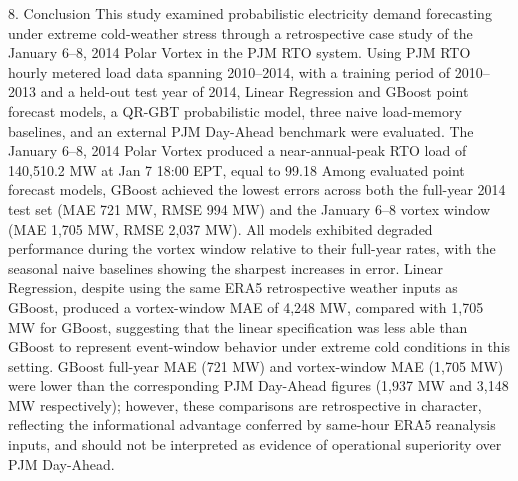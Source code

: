 8. Conclusion
This study examined probabilistic electricity demand forecasting under extreme cold-weather stress through a retrospective case study of the January 6–8, 2014 Polar Vortex in the PJM RTO system. Using PJM RTO hourly metered load data spanning 2010–2014, with a training period of 2010–2013 and a held-out test year of 2014, Linear Regression and GBoost point forecast models, a QR-GBT probabilistic model, three naive load-memory baselines, and an external PJM Day-Ahead benchmark were evaluated. The January 6–8, 2014 Polar Vortex produced a near-annual-peak RTO load of 140,510.2 MW at Jan 7 18:00 EPT, equal to 99.18%
Among evaluated point forecast models, GBoost achieved the lowest errors across both the full-year 2014 test set (MAE 721 MW, RMSE 994 MW) and the January 6–8 vortex window (MAE 1,705 MW, RMSE 2,037 MW). All models exhibited degraded performance during the vortex window relative to their full-year rates, with the seasonal naive baselines showing the sharpest increases in error. Linear Regression, despite using the same ERA5 retrospective weather inputs as GBoost, produced a vortex-window MAE of 4,248 MW, compared with 1,705 MW for GBoost, suggesting that the linear specification was less able than GBoost to represent event-window behavior under extreme cold conditions in this setting. GBoost full-year MAE (721 MW) and vortex-window MAE (1,705 MW) were lower than the corresponding PJM Day-Ahead figures (1,937 MW and 3,148 MW respectively); however, these comparisons are retrospective in character, reflecting the informational advantage conferred by same-hour ERA5 reanalysis inputs, and should not be interpreted as evidence of operational superiority over PJM Day-Ahead.
